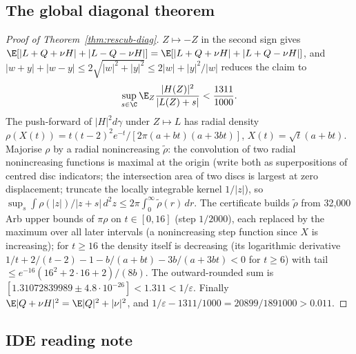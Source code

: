 \subsection{The global diagonal theorem}
\begin{proof}[Proof of Theorem~\ref{thm:rescub-diag}]
$Z\mapsto-Z$ in the second sign gives $\E[|L+Q+\nu H|+|L-Q-\nu H|]=\E[|L+Q+\nu H|+|L+Q-\nu H|]$, and $|w+y|+|w-y|\le2\sqrt{|w|^2+|y|^2}\le2|w|+|y|^2/|w|$ reduces the claim to
\begin{equation}\label{eq:rescub10}
\sup_{s\in\C}\E_Z\frac{|H(Z)|^2}{|L(Z)+s|}<\frac{1311}{1000}.
\end{equation}
The push-forward of $|H|^2d\gamma$ under $Z\mapsto L$ has radial density $\rho(X(t))=t(t-2)^2e^{-t}/[2\pi(a+bt)(a+3bt)]$, $X(t)=\sqrt t(a+bt)$. Majorise $\rho$ by a radial nonincreasing
$\tilde\rho$: the convolution of two radial nonincreasing functions is maximal at the origin (write both as superpositions of centred disc indicators; the intersection area of two discs is
largest at zero displacement; truncate the locally integrable kernel $1/|z|$), so $\sup_s\int\rho(|z|)/|z+s|\,d^2z\le2\pi\int_0^\infty\tilde\rho(r)\,dr$. The certificate builds $\tilde\rho$ from
32,000 Arb upper bounds of $\pi\rho$ on $t\in[0,16]$ (step $1/2000$), each replaced by the maximum over all later intervals (a nonincreasing step function since $X$ is increasing); for $t\ge16$
the density itself is decreasing (its logarithmic derivative $1/t+2/(t-2)-1-b/(a+bt)-3b/(a+3bt)<0$ for $t\ge6$) with tail $\le e^{-16}(16^2+2\cdot16+2)/(8b)$. The outward-rounded sum is
$[1.31072839989\pm4.8\cdot10^{-26}]<1.311<1/\varepsilon$. Finally $\E|Q+\nu H|^2=\E|Q|^2+|\nu|^2$, and $1/\varepsilon-1311/1000=20899/1891000>0.011$.
\end{proof}

\subsection{IDE reading note}\label{sec:rescub-reading}

